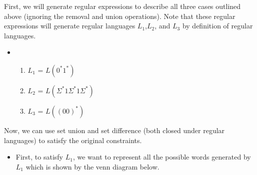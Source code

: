 \documentclass[12pt]{article}
\def\firstcircle{(90:1.75cm) circle (2.5cm)}
\def\secondcircle{(210:1.75cm) circle (2.5cm)}
\def\thirdcircle{(330:1.75cm) circle (2.5cm)}
\newenvironment{solution}[1][{\color{red} Solution:}]{\begin{trivlist}
\item[\hskip \labelsep {\bfseries #1}\hskip \labelsep {\bfseries}]}{\end{trivlist}}
\begin{document}
\begin{solution}
\item First, we will generate regular expressions to describe all three cases outlined above (ignoring the removal and union operations). Note that these regular expressions will generate regular languages $L_1$,$L_2$, and $L_3$ by definition of regular languages. 
     \begin{itemize}[label=]
     \item 
        \begin{enumerate}
        \item $L_1$ = $L (0^* 1^*)$
        \item $L_2$ = $L(\Sigma^* 1 \Sigma^* 1 \Sigma^*)$
        \item $L_3$ = $L((00)^*)$
        \end{enumerate}
    \end{itemize}
\item Now, we can use set union and set difference (both closed under regular languages) to satisfy the original constraints. 
    \begin{itemize} [label=]
        \item First, to satisfy $L_1$,  we want to represent all the possible words generated by $L_1$ which is shown by the venn diagram below. 
    \end{itemize}


\end{solution}
\end{document}
